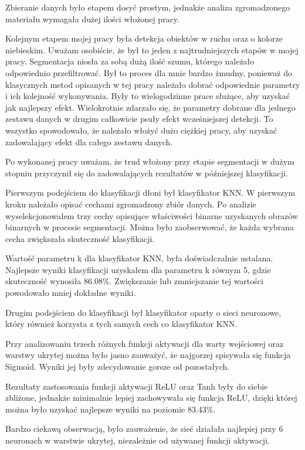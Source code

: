\documentclass[a4paper,12pt,twoside,openany]{report}
\begin{document}
	Zbieranie danych było etapem dosyć prostym, jednakże analiza zgromadzonego materiału wymagała dużej ilości włożonej pracy.
	
	Kolejnym etapem mojej pracy była detekcja obiektów w ruchu oraz o kolorze niebieskim. Uważam osobiście, że był to jeden z najtrudniejszych etapów w mojej pracy. Segmentacja niosła za sobą dużą ilość szumu, którego należało odpowiednio przefiltrować. Był to proces dla mnie bardzo żmudny, ponieważ do klasycznych metod opisanych w tej pracy należało dobrać odpowiednie parametry i ich kolejność wykonywania. Były to wielogodzinne prace służące, aby uzyskać jak najlepszy efekt. Wielokrotnie zdarzało się, że parametry dobrane dla jednego zestawu danych w drugim całkowicie psuły efekt wcześniejszej detekcji. To wszystko spowodowało, że należało włożyć dużo ciężkiej pracy, aby uzyskać zadowalający efekt dla całego zestawu danych.
	
	Po wykonanej pracy uważam, że trud włożony przy etapie segmentacji w dużym stopniu przyczynił się do zadowalających rezultatów w późniejszej klasyfikacji.
	
	Pierwszym podejściem do klasyfikacji dłoni był klasyfikator KNN. W pierwszym kroku należało opisać cechami zgromadzony zbiór danych. Po analizie wyselekcjonowałem trzy cechy opisujące właściwości binarne uzyskanych obrazów binarnych w procesie segmentacji. Można było zaobserwować, że każda wybrana cecha zwiększała skuteczność klasyfikacji. 
	
	Wartość parametru k dla klasyfikator KNN, była doświadczalnie ustalana. Najlepsze wyniki klasyfikacji uzyskałem dla parametru k równym 5, gdzie skuteczność wynosiła 86.08\%. Zwiększanie lub zmniejszanie tej wartości powodowało mniej dokładne wyniki.
	
	Drugim podejściem do klasyfikacji był klasyfikator oparty o sieci neuronowe, który również korzysta z tych samych cech co klasyfikator KNN. 
	
	Przy analizowaniu trzech różnych funkcji aktywacji dla warty wejściowej oraz warstwy ukrytej można było jasno zauważyć, że najgorzej spisywała się funkcja Sigmoid. Wyniki jej były zdecydowanie gorsze od pozostałych. 
	
	Rezultaty zastosowania funkcji aktywacji ReLU oraz Tanh były do siebie zbliżone, jednakże minimalnie lepiej zachowywała się funkcja ReLU, dzięki której można było uzyskać najlepsze wyniki  na poziomie 83.43\%. 
	
	Bardzo ciekawą obserwacją, było zauważenie, że sieć działała najlepiej przy 6 neuronach w warstwie ukrytej, niezależnie od używanej funkcji aktywacji.
	
\end{document}

